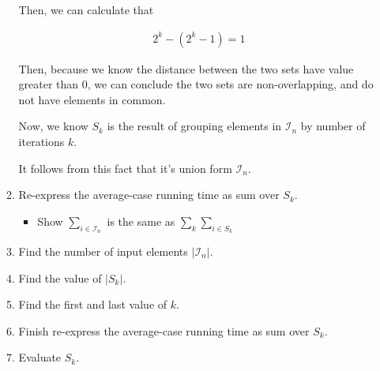 \documentclass[12pt]{article}
\begin{document}
\begin{enumerate}[a.]
\begin{mdframed}
\begin{enumerate}[1.]
\begin{mdframed}
            \bigskip

            Then, we can calculate that

            \begin{align}
                2^k - (2^k - 1) = 1
            \end{align}

            \bigskip

            Then, because we know the distance between the two sets have value greater than 0, we can
            conclude the two sets are non-overlapping, and do not have elements in common.

            \bigskip

            Now, we know $S_k$ is the result of grouping elements in $\mathcal{I}_n$
            by number of iterations $k$.

            \bigskip

            It follows from this fact that it's union form $\mathcal{I}_n$.
        \end{mdframed}

        \item Re-express the average-case running time as sum over $S_k$.
        \begin{itemize}
            \item Show $\sum\limits_{i \in \mathcal{I}_n}$ is the same as $\sum\limits_{k} \sum\limits_{i \in S_k}$
        \end{itemize}

        \item Find the number of input elements $\lvert \mathcal{I}_n \rvert$.

        \item Find the value of $\lvert S_k \rvert$.
        \item Find the first and last value of $k$.
        \item Finish re-express the average-case running time as sum over $S_k$.
        \item Evaluate $S_k$.


\end{enumerate}
\end{mdframed}
\end{enumerate}
\end{document}
